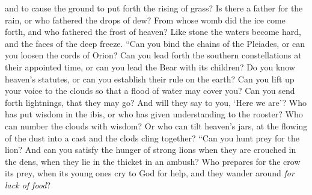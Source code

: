 \begin{biblechapter}
and to cause the ground to put forth the rising of grass?
\verse Is there a father for the rain, 
or who fathered the drops of dew?
\verse From whose womb did the ice come forth, 
and who fathered the frost of heaven?
\verse Like stone the waters become hard, 
and the faces of the deep freeze.
\verse “Can you bind the chains of the Pleiades, 
or can you loosen the cords of Orion?
\verse Can you lead forth the southern constellations at their appointed time, 
or can you lead the Bear with its children?
\verse Do you know heaven’s statutes, 
or can you establish their rule on the earth?
\verse Can you lift up your voice to the clouds 
so that a flood of water may cover you?
\verse Can you send forth lightnings, that they may go? 
And will they say to you, ‘Here we are’?
\verse Who has put wisdom in the ibis, 
or who has given understanding to the rooster?
\verse Who can number the clouds with wisdom? 
Or who can tilt heaven’s jars,
\verse at the flowing of the dust into a cast 
and the clods cling together?
\verse “Can you hunt prey for the lion? 
And can you satisfy the hunger of strong lions
\verse when they are crouched in the dens, 
when they lie in the thicket in an ambush?
\verse Who prepares for the crow its prey, 
when its young ones cry to God for help, 
and they wander around \textit{for lack of food}?
\end{biblechapter}

